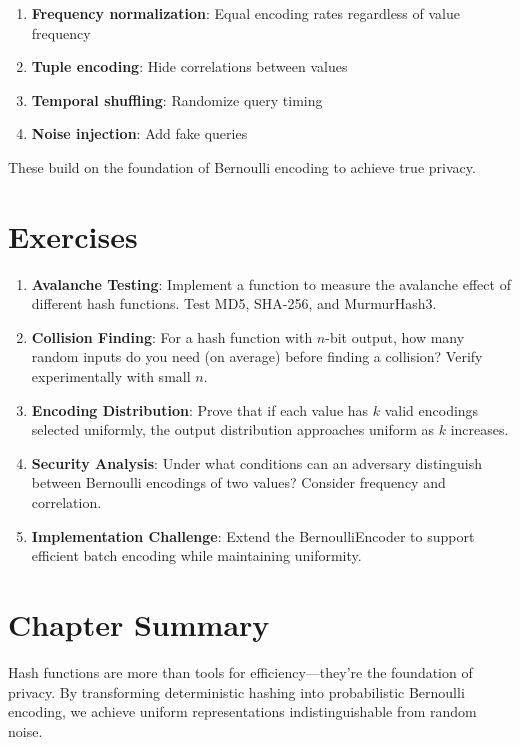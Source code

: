 \begin{enumerate}
\item \textbf{Frequency normalization}: Equal encoding rates regardless of value frequency
\item \textbf{Tuple encoding}: Hide correlations between values
\item \textbf{Temporal shuffling}: Randomize query timing
\item \textbf{Noise injection}: Add fake queries
\end{enumerate}

These build on the foundation of Bernoulli encoding to achieve true privacy.

\section{Exercises}

\begin{enumerate}
\item \textbf{Avalanche Testing}: Implement a function to measure the avalanche effect of different hash functions. Test MD5, SHA-256, and MurmurHash3.

\item \textbf{Collision Finding}: For a hash function with $n$-bit output, how many random inputs do you need (on average) before finding a collision? Verify experimentally with small $n$.

\item \textbf{Encoding Distribution}: Prove that if each value has $k$ valid encodings selected uniformly, the output distribution approaches uniform as $k$ increases.

\item \textbf{Security Analysis}: Under what conditions can an adversary distinguish between Bernoulli encodings of two values? Consider frequency and correlation.

\item \textbf{Implementation Challenge}: Extend the BernoulliEncoder to support efficient batch encoding while maintaining uniformity.
\end{enumerate}

\section{Chapter Summary}

Hash functions are more than tools for efficiency—they're the foundation of privacy. By transforming deterministic hashing into probabilistic Bernoulli encoding, we achieve uniform representations indistinguishable from random noise.

